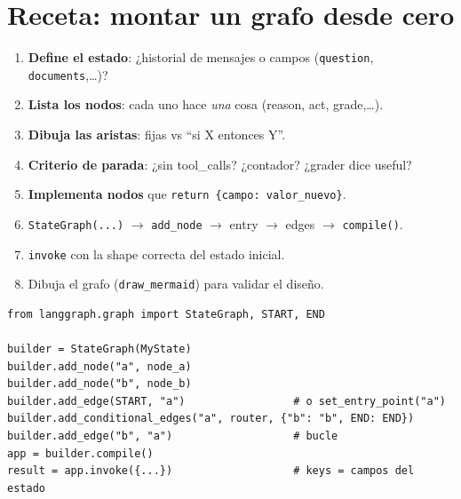 \documentclass[11pt,a4paper]{article}
\begin{document}
\section{Receta: montar un grafo desde cero}
\label{sec:recipe}

\begin{howto}[title=Checklist (cópiala cuando construyas uno nuevo)]
\begin{enumerate}[leftmargin=*,itemsep=2pt]
  \item \textbf{Define el estado}: ¿historial de mensajes o campos (\texttt{question}, \texttt{documents},\ldots)?
  \item \textbf{Lista los nodos}: cada uno hace \emph{una} cosa (reason, act, grade,\ldots).
  \item \textbf{Dibuja las aristas}: fijas vs ``si X entonces Y''.
  \item \textbf{Criterio de parada}: ¿sin tool\_calls? ¿contador? ¿grader dice useful?
  \item \textbf{Implementa nodos} que \texttt{return \{campo: valor\_nuevo\}}.
  \item \texttt{StateGraph(...)} $\to$ \texttt{add\_node} $\to$ entry $\to$ edges $\to$ \texttt{compile()}.
  \item \texttt{invoke} con la shape correcta del estado inicial.
  \item Dibuja el grafo (\texttt{draw\_mermaid}) para validar el diseño.
\end{enumerate}
\end{howto}

\begin{fromcode}[title=Esqueleto genérico]
\begin{lstlisting}
from langgraph.graph import StateGraph, START, END

builder = StateGraph(MyState)
builder.add_node("a", node_a)
builder.add_node("b", node_b)
builder.add_edge(START, "a")                 # o set_entry_point("a")
builder.add_conditional_edges("a", router, {"b": "b", END: END})
builder.add_edge("b", "a")                   # bucle
app = builder.compile()
result = app.invoke({...})                   # keys = campos del estado
\end{lstlisting}
\end{fromcode}

\end{document}
